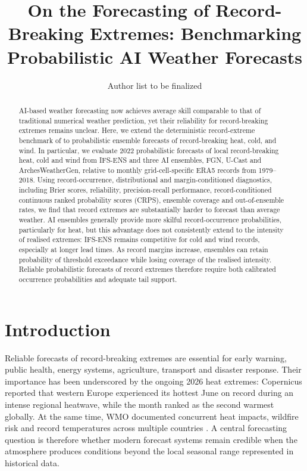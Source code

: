 \documentclass[11pt]{article}
\title{On the Forecasting of Record-Breaking Extremes: Benchmarking Probabilistic AI Weather Forecasts}
\author[1]{Author list to be finalized}
\affil[1]{Affiliations to be finalized}
\date{}
\begin{document}
\maketitle

\begin{abstract}

AI-based weather forecasting now achieves average skill comparable to that of traditional numerical weather prediction, yet their reliability for record-breaking extremes remains unclear. Here, we extend the deterministic record-extreme benchmark of \citet{zhang2026recordextremes} to probabilistic ensemble forecasts of record-breaking heat, cold, and wind. In particular, we evaluate 2022 probabilistic forecasts of local record-breaking heat, cold and wind from IFS-ENS and three AI ensembles, FGN, U-Cast and ArchesWeatherGen, relative to monthly grid-cell-specific ERA5 records from 1979--2018. Using record-occurrence, distributional and margin-conditioned diagnostics, including Brier scores, reliability, precision-recall performance, record-conditioned continuous ranked probability scores (CRPS), ensemble coverage and out-of-ensemble rates, we find that record extremes are substantially harder to forecast than average weather. AI ensembles generally provide more skilful record-occurrence probabilities, particularly for heat, but this advantage does not consistently extend to the intensity of realised extremes: IFS-ENS remains competitive for cold and wind records, especially at longer lead times. As record margins increase, ensembles can retain probability of threshold exceedance while losing coverage of the realised intensity. Reliable probabilistic forecasts of record extremes therefore require both calibrated occurrence probabilities and adequate tail support.

\end{abstract}

\section{Introduction}

Reliable forecasts of record-breaking extremes are essential for early warning, public health, energy systems, agriculture, transport and disaster response. Their importance has been underscored by the ongoing 2026 heat extremes: Copernicus reported that western Europe experienced its hottest June on record during an intense regional heatwave, while the month ranked as the second warmest globally. At the same time, WMO documented concurrent heat impacts, wildfire risk and record temperatures across multiple countries \citep{c3s2026juneheat,wmo2026europeheat}. A central forecasting question is therefore whether modern forecast systems remain credible when the atmosphere produces conditions beyond the local seasonal range represented in historical data.
\end{document}
